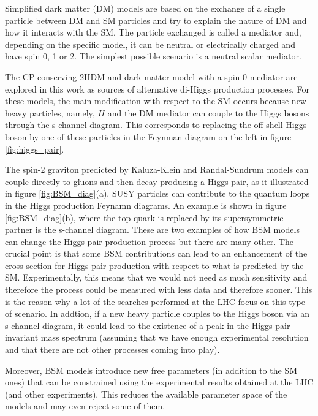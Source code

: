 Simplified dark matter (DM) models are based on the exchange of a single particle between DM and SM particles and try to explain the nature of DM and how it interacts with the SM. The particle exchanged is called a mediator and, depending on the specific model, it can be neutral or electrically charged and have spin 0, 1 or 2. The simplest possible scenario is a neutral scalar mediator.

The CP-conserving 2HDM and dark matter model with a spin 0 mediator are explored in this work as sources of alternative di-Higgs production processes. For these models, the main modification with respect to the SM occurs because new heavy particles, namely, $H$ and the DM mediator can couple to the Higgs bosons through the s-channel diagram. This corresponds to replacing the off-shell Higgs boson by one of these particles in the Feynman diagram on the left in figure \ref{fig:higgs_pair}.

The spin-2 graviton predicted by Kaluza-Klein and Randal-Sundrum models can couple directly to gluons and then decay producing a Higgs pair, as it illustrated in figure \ref{fig:BSM_diag}(a). SUSY particles can contribute to the quantum loops in the Higgs production Feynamn diagrams. An example is shown in figure \ref{fig:BSM_diag}(b), where the top quark is replaced by its supersymmetric partner is the s-channel diagram. These are two examples of how BSM models can change the Higgs pair production process but there are many other. The crucial point is that some BSM contributions can lead to an enhancement of the cross section for Higgs pair production with respect to what is predicted by the SM. Experimentally, this means that we would not need as much sensitivity and therefore the process could be measured with less data and therefore sooner. This is the reason why a lot of the searches performed at the LHC focus on this type of scenario. In addtion, if a new heavy particle couples to the Higgs boson via an s-channel diagram, it could lead to the existence of a peak in the Higgs pair invariant mass spectrum (assuming that we have enough experimental resolution and that there are not other processes coming into play). 

Moreover, BSM models introduce new free parameters (in addition to the SM ones) that can be constrained using the experimental results obtained at the LHC (and other experiments). This reduces the available parameter space of the models and may even reject some of them.

